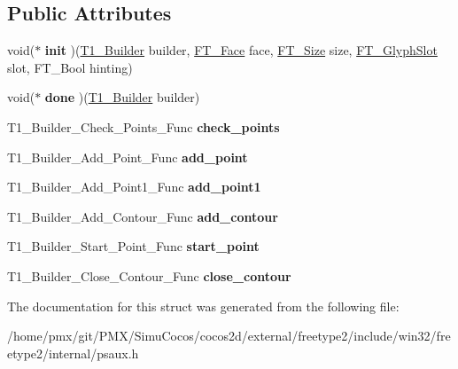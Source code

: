 \subsection*{Public Attributes}
\begin{DoxyCompactItemize}
\item 
\mbox{\label{structT1__Builder__FuncsRec___abdb04c5d1f2e281fa1a38ab03293ccb9}} 
void($\ast$ {\bfseries init} )(\hyperlink{structT1__BuilderRec__}{T1\+\_\+\+Builder} builder, \hyperlink{structFT__FaceRec__}{F\+T\+\_\+\+Face} face, \hyperlink{structFT__SizeRec__}{F\+T\+\_\+\+Size} size, \hyperlink{structFT__GlyphSlotRec__}{F\+T\+\_\+\+Glyph\+Slot} slot, F\+T\+\_\+\+Bool hinting)
\item 
\mbox{\label{structT1__Builder__FuncsRec___a1a95d417d9b6f04d8f5ab5998e2e2008}} 
void($\ast$ {\bfseries done} )(\hyperlink{structT1__BuilderRec__}{T1\+\_\+\+Builder} builder)
\item 
\mbox{\label{structT1__Builder__FuncsRec___a303aa60891edacdc0a9665663577a44a}} 
T1\+\_\+\+Builder\+\_\+\+Check\+\_\+\+Points\+\_\+\+Func {\bfseries check\+\_\+points}
\item 
\mbox{\label{structT1__Builder__FuncsRec___a8f06e116ae86a88bb3d6d2ea5fd6fdd1}} 
T1\+\_\+\+Builder\+\_\+\+Add\+\_\+\+Point\+\_\+\+Func {\bfseries add\+\_\+point}
\item 
\mbox{\label{structT1__Builder__FuncsRec___a52113cffcd739ad679c0b162dc81b530}} 
T1\+\_\+\+Builder\+\_\+\+Add\+\_\+\+Point1\+\_\+\+Func {\bfseries add\+\_\+point1}
\item 
\mbox{\label{structT1__Builder__FuncsRec___af069cac890c0d2d27532a973ffa95a33}} 
T1\+\_\+\+Builder\+\_\+\+Add\+\_\+\+Contour\+\_\+\+Func {\bfseries add\+\_\+contour}
\item 
\mbox{\label{structT1__Builder__FuncsRec___ab4897186c65875b4312d4ef68aad9d02}} 
T1\+\_\+\+Builder\+\_\+\+Start\+\_\+\+Point\+\_\+\+Func {\bfseries start\+\_\+point}
\item 
\mbox{\label{structT1__Builder__FuncsRec___abe163896432cc768719bf87cef0d1266}} 
T1\+\_\+\+Builder\+\_\+\+Close\+\_\+\+Contour\+\_\+\+Func {\bfseries close\+\_\+contour}
\end{DoxyCompactItemize}


The documentation for this struct was generated from the following file\+:\begin{DoxyCompactItemize}
\item 
/home/pmx/git/\+P\+M\+X/\+Simu\+Cocos/cocos2d/external/freetype2/include/win32/freetype2/internal/psaux.\+h\end{DoxyCompactItemize}
